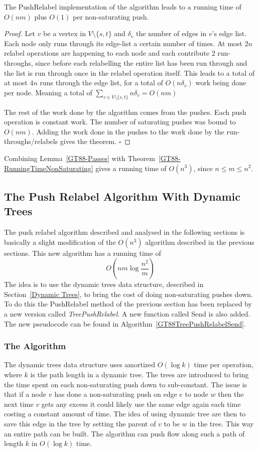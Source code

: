 \begin{theorem}\label{GT88-RunningTimeNonSaturating}
The PushRelabel implementation of the algorithm leads to a running time of $O(nm)$ plus $O(1)$ per non-saturating push.
\end{theorem}
\begin{proof}
Let $v$ be a vertex in $V \setminus \{s,t\}$ and $\delta_v$ the number of edges in $v$'s edge list. Each node only runs through its edge-list a certain number of times.
At most $2n$ relabel operations are happening to each node and each contribute 2 run-throughs, since before each relabelling the entire list has been run through and the list is run through once 
in the relabel operation itself. This leads to a total of at most $4n$ runs through the edge list, for a total of $O(n\delta_v)$ work being done per node. Meaning
a total of $\sum_{v\in V \setminus \{s,t\}}{n\delta_v} = O(nm)$

The rest of the work done by the algorithm comes from the pushes. Each push operation is constant work. The number of saturating pushes was bound to $O(nm)$.
Adding the work done in the pushes to the work done by the run-throughs/relabels gives the theorem. 
$\square$
\end{proof}

Combining Lemma~\ref{GT88-Passes} with Theorem~\ref{GT88-RunningTimeNonSaturating} gives a running time of $O(n^3)$, since $n \leq m \leq n^2$.

\subsection{The Push Relabel Algorithm With Dynamic Trees}\label{GT88-Dyn}
The push relabel algorithm described and analysed in the following sections is basically a slight modification of the $O(n^3)$ algorithm described in the previous sections.
This new algorithm has a running time of $$O(nm\log{\frac{n^2}{m}})$$
The idea is to use the dynamic trees data structure, described in Section~\ref{Dynamic Trees}, to bring the cost of doing non-saturating pushes down.
To do this the PushRelabel method of the previous section has been replaced by a new version called \emph{TreePushRelabel}. A new function called {\sc Send} is also added. The 
new pseudocode can be found in Algorithm~\ref{GT88TreePushRelabelSend}.

\subsubsection{The Algorithm}
The dynamic trees data structure uses amortized $O(\log{k})$ time per operation, where $k$ is the path length in a dynamic tree.
The trees are introduced to bring the time spent on each non-saturating push down to sub-constant. The issue is that if a node $v$ has done a non-saturating push 
on edge $e$ to node $w$ then the next time $v$ gets any excess it could likely use the same edge again each time costing a constant amount of time. The idea of
using dynamic tree are then to save this edge in the tree by setting the parent of $v$ to be $w$ in the tree. This way an entire path can be built. 
The algorithm can push flow along such a path of length $k$ in $O(\log{k})$ time. 

